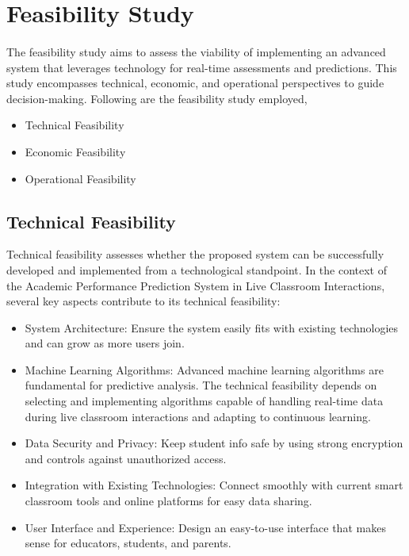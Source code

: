 \section{Feasibility Study}
\paragraph{}
The feasibility study aims to assess the viability of implementing an advanced system that leverages technology for real-time assessments and predictions. This study encompasses technical, economic, and operational perspectives to guide decision-making. Following are the
feasibility study employed,
\begin{itemize}
\item Technical Feasibility
\item Economic Feasibility
\item Operational Feasibility
\end{itemize}

\subsection {Technical Feasibility}
\par \hspace{1cm}Technical feasibility assesses whether the proposed system can be successfully developed and implemented from a technological standpoint. In the context of the Academic Performance Prediction System in Live Classroom Interactions, several key aspects contribute to its technical feasibility:
\begin{itemize}
\item System Architecture: Ensure the system easily fits with existing technologies and can grow as more users join.
\item Machine Learning Algorithms: Advanced machine learning algorithms are fundamental for predictive analysis. The technical feasibility depends on selecting and implementing algorithms capable of handling real-time data during live classroom interactions and adapting to continuous learning.
\item Data Security and Privacy: Keep student info safe by using strong encryption and controls against unauthorized access.
\item Integration with Existing Technologies: Connect smoothly with current smart classroom tools and online platforms for easy data sharing.
\item User Interface and Experience: Design an easy-to-use interface that makes sense for educators, students, and parents.
\end{itemize}
